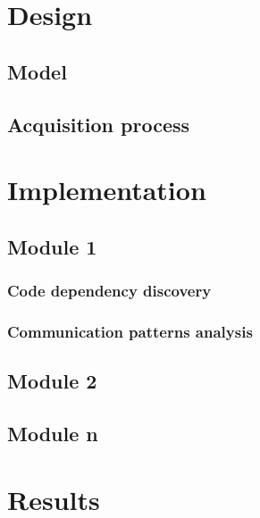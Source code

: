 \section{Design}
\subsection{Model}
\subsection{Acquisition process}


\section{Implementation}
\subsection{Module 1}
\subsubsection{Code dependency discovery}
\subsubsection{Communication patterns analysis}

\subsection{Module 2}
\subsection{Module n}


\section{Results}
